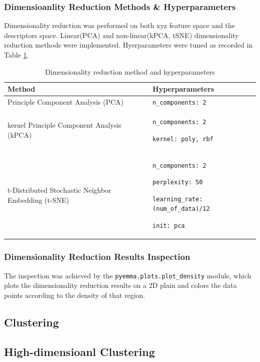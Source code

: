\documentclass[a4paper]{article}
\begin{document}
\subsubsection{Dimensioanlity Reduction Methods \& Hyperparameters}
Dimensionality reduction was performed on both xyz feature space and the descriptors space. Linear(PCA) and non-linear(kPCA, tSNE) dimensionality reduction methods were implemented. Hyerparameters were tuned as recorded in Table \ref{table: dimreduct}.

\begin{table}[H]
    \centering
    \caption{Dimensionality reduction method and hyperparameters}
    \begin{tabular}{p{}|p{}}
    \hline \hline
        \textbf{Method} & \textbf{Hyperparameters} \\
        \hline
        Principle Component Analysis (PCA) & \texttt{n\_components: 2} \\
        \hline
        kernel Principle Component Analysis (kPCA) & \texttt{n\_components: 2} \par \texttt{kernel: poly, rbf} \\
        \hline
        t-Distributed Stochastic Neighbor Embedding (t-SNE)\cite{KobakDmitry} & \texttt{n\_components: 2} \par \texttt{perplexity: 50} \par \texttt{learning\_rate: (num\_of\_data)/12} \par \texttt{init: pca} \\
        \hline \hline
    \end{tabular}
    \label{table: dimreduct}
\end{table}

\subsubsection{Dimensionality Reduction Results Inspection}
The inspection was achieved by the \texttt{pyemma.plots.plot\_density} module, which plots the dimensionality reduction results on a 2D plain and colors the data points according to the density of that region.

\subsection{Clustering}

\subsection{High-dimensioanl Clustering}
\end{document}
